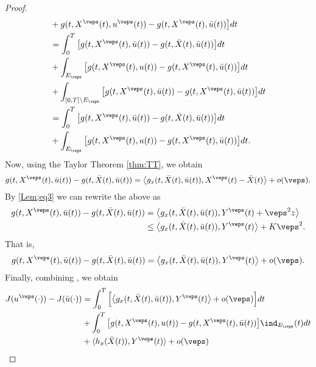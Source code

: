 \begin{proof}
\begin{align*}
            &+ g(t, X^{\veps}(t), u^{\veps}(t)) - g(t, X^{\veps}(t), \Bar{u}(t)) \big] dt 
        \\
        &= \int_{0}^{T}\big[ g(t, X^{\veps}(t), \Bar{u}(t)) - g(t, \Bar{X}(t), \Bar{u}(t)) \big]dt 
        \\
            &+ \int_{E_{\veps}}\big[g(t, X^{\veps}(t), u(t)) - g(t, X^{\veps}(t), \Bar{u}(t)) \big]dt 
        \\
            &+ \int_{[0,T]\setminus E_{\veps}}\big[g(t, X^{\veps}(t), \Bar{u}(t)) - g(t, X^{\veps}(t), \Bar{u}(t)) \big]dt\\
        &= \int_{0}^{T}\big[ g(t, X^{\veps}(t), \Bar{u}(t)) - g(t, \Bar{X}(t), \Bar{u}(t)) \big]dt 
        \\
            &+ \int_{E_{\veps}}\big[g(t, X^{\veps}(t), u(t)) - g(t, X^{\veps}(t), \Bar{u}(t)) \big]dt.
    \end{align*}
    Now, using the Taylor Theorem \cref{thm:TT}, we obtain 
    \begin{equation*}
        g(t, X^{\veps}(t), \Bar{u}(t)) - g(t, \Bar{X}(t), \Bar{u}(t)) = %
        \big\langle  g_x(t, \Bar{X}(t), \Bar{u}(t)), X^{\veps}(t) - \Bar{X}(t) \big\rangle + o(\veps).
    \end{equation*}
    By \cref{Lem;eq3} we can rewrite the above as
    \begin{align*}
        g(t, X^{\veps}(t), \Bar{u}(t)) - g(t, \Bar{X}(t), \Bar{u}(t)) &=
        \big\langle %
            g_x(t, \Bar{X}(t), \Bar{u}(t)), Y^{\veps}(t) + \veps^{2}z
        \big\rangle \\
        &\leq 
        \big\langle g_x(t, \Bar{X}(t), \Bar{u}(t)), Y^{\veps}(t) \big\rangle %
            + K\veps^{2}.
    \end{align*}
    That is,
    \begin{equation*}
        g(t, X^{\veps}(t), \Bar{u}(t)) - g(t, \Bar{X}(t), \Bar{u}(t)) = %
            \big\langle g_x(t, \Bar{X}(t), \Bar{u}(t)), Y^{\veps}(t) \big\rangle + o(\veps).
    \end{equation*}
    Finally, combining , we obtain
    \begin{align*}
        J(u^{\veps}(\cdot)) - J(\Bar{u}(\cdot)) &= %
            \int_{0}^{T} \Big[\big\langle g_x(t, \Bar{X}(t), \Bar{u}(t)), Y^{\veps}(t) \big\rangle %
            + o(\veps)\Big]dt \\
        &+ \int_{0}^{T}\big[g(t, X^{\veps}(t),u(t)) - g(t, X^{\veps}(t),\Bar{u}(t)) \big]\ind_{E_{\veps}}(t)dt \\
        &+ \langle h_{x}(\Bar{X}(t)), Y^{\veps}(t)\rangle + o(\veps) \\

\end{align*}
\end{proof}
